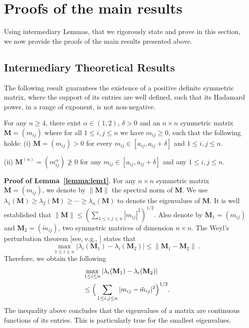 \documentclass[conference,letterpaper]{IEEEtran}
\numberwithin{equation}{section}
\newcommand{\lbl}{\label}
\newcommand{\bea}{\begin{eqnarray}}
\newcommand{\eea}{\end{eqnarray}}
\begin{document}
\section{Proofs of the main results}\lbl{sec:proofs}
Using intermediary Lemmas, that we rigorously state and prove in this section, we now provide the proofs of the main results presented above.

\subsection{Intermediary Theoretical Results}
The following result guarantees the existence of a positive definite symmetric matrix, where the support of its entries are well defined, such that its Hadamard power, in a range of exponent, is not non-negative.
\begin{lem}\lbl{lemma:lem1} For any $n\geq 4$, there exist $\alpha\in (1,2)$, $\delta>0$ and an $n\times n$ symmetric matrix $\mathbf{M}=(m_{ij})$ where for all $1\leq i, j \leq n$ we have $m_{ij}\geq 0$, such that the following holds:
(i) $\mathbf{M}=(m_{ij})>0$  for every $m_{ij}\in [a_{ij}, a_{ij}+\delta]$ and $1\leq i, j \leq n.$

(ii) $\mathbf{M}^{(\alpha)}=(m_{ij}^{\alpha})\ngeqslant 0$  for any $m_{ij}\in [a_{ij}, a_{ij}+\delta]$ and any $1\leq i, j \leq n.$
\end{lem}
\medskip
\noindent\textbf{Proof of Lemma~\ref{lemma:lem1}}. For any $n\times n$ symmetric matrix $\mathbf{M}=(m_{ij})$, we denote by $\|\mathbf{M}\|$ the spectral norm of $\mathbf{M}$. 
We use $\lambda_1(\mathbf{M})\geq \lambda_2(\mathbf{M})\geq \cdots \geq \lambda_n(\mathbf{M})$ to denote  the eigenvalues of $\mathbf{M}$.  
It is well established that $\|\mathbf{M}\|\leq (\sum_{1\leq i, j \leq n}|m_{ij}|^2)^{1/2}$. 
Also denote by $\mathbf{M}_1=(m_{ij})$ and $\mathbf{M}_2=(\tilde{m}_{ij})$, two symmetric matrices of dimension $n\times n$. 
The Weyl's perturbation theorem [see, e.g., \cite{horn1985}] states that
$$\max_{1\leq i \leq n}|\lambda_i(\mathbf{M}_1)-\lambda_i(\mathbf{M}_2)|\leq \|\mathbf{M}_1-\mathbf{M}_2\| \ .$$  
Therefore, we obtain the following
\bea
& \max_{1\leq i \leq n}|\lambda_i(\mathbf{M}_1)-\lambda_i(\mathbf{M}_2)|\\\notag
&\leq \Big(\sum_{1\leq i, j \leq n}|m_{ij}-\tilde{m}_{ij}|^2\Big)^{1/2}.\lbl{flower_could}
\eea
The inequality above concludes that the eigenvalues of a matrix are continuous functions of its entries. 
This is particularly true for the smallest eigenvalues.
\end{document}
